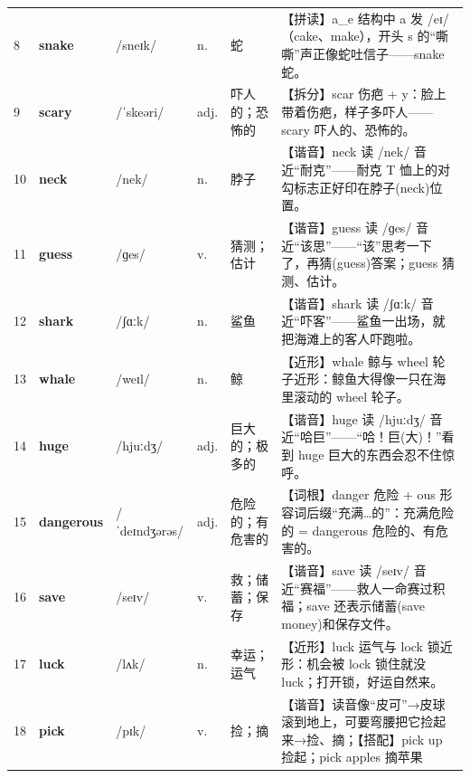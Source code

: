 \documentclass[UTF8,a4paper,11pt,oneside]{ctexbook}
\newcommand{\cellword}[1]{{\bfseries\textcolor{wordcol}{#1}}}
\newcommand{\cellipa}[1]{{\footnotesize\textcolor{ipacol}{#1}}}
\newcommand{\cellpos}[1]{\textcolor{poscol}{#1}}
\newcommand{\cellno}[1]{\textcolor{volcolor!75!black}{#1}}
\begin{document}
{\begin{longtable}{@{}C{0.045\textwidth}L{0.155\textwidth}L{0.175\textwidth}C{0.070\textwidth}L{0.180\textwidth}L{0.282\textwidth}@{}}
\cellno{8} & \cellword{snake} & \cellipa{/sneɪk/} & \cellpos{n.} & 蛇 & \textcolor{tagSpell}{【拼读】}a\_e 结构中 a 发 /eɪ/（cake、make），开头 s 的“嘶嘶”声正像蛇吐信子——snake 蛇。 \\
 \cellno{9} & \cellword{scary} & \cellipa{/ˈskeəri/} & \cellpos{adj.} & 吓人的；恐怖的 & \textcolor{tagSplit}{【拆分】}scar 伤疤 + y：脸上带着伤疤，样子多吓人——scary 吓人的、恐怖的。 \\
\cellno{10} & \cellword{neck} & \cellipa{/nek/} & \cellpos{n.} & 脖子 & \textcolor{tagSound}{【谐音】}neck 读 /nek/ 音近“耐克”——耐克 T 恤上的对勾标志正好印在脖子(neck)位置。 \\
 \cellno{11} & \cellword{guess} & \cellipa{/ɡes/} & \cellpos{v.} & 猜测；估计 & \textcolor{tagSound}{【谐音】}guess 读 /ɡes/ 音近“该思”——“该”思考一下了，再猜(guess)答案；guess 猜测、估计。 \\
\cellno{12} & \cellword{shark} & \cellipa{/ʃɑːk/} & \cellpos{n.} & 鲨鱼 & \textcolor{tagSound}{【谐音】}shark 读 /ʃɑːk/ 音近“吓客”——鲨鱼一出场，就把海滩上的客人吓跑啦。 \\
 \cellno{13} & \cellword{whale} & \cellipa{/weɪl/} & \cellpos{n.} & 鲸 & \textcolor{tagNear}{【近形】}whale 鲸与 wheel 轮子近形：鲸鱼大得像一只在海里滚动的 wheel 轮子。 \\
\cellno{14} & \cellword{huge} & \cellipa{/hjuːdʒ/} & \cellpos{adj.} & 巨大的；极多的 & \textcolor{tagSound}{【谐音】}huge 读 /hjuːdʒ/ 音近“哈巨”——“哈！巨(大)！”看到 huge 巨大的东西会忍不住惊呼。 \\
 \cellno{15} & \cellword{dangerous} & \cellipa{/ˈdeɪndʒərəs/} & \cellpos{adj.} & 危险的；有危害的 & \textcolor{tagRoot}{【词根】}danger 危险 + ous 形容词后缀“充满…的”：充满危险的 = dangerous 危险的、有危害的。 \\
\cellno{16} & \cellword{save} & \cellipa{/seɪv/} & \cellpos{v.} & 救；储蓄；保存 & \textcolor{tagSound}{【谐音】}save 读 /seɪv/ 音近“赛福”——救人一命赛过积福；save 还表示储蓄(save money)和保存文件。 \\
 \cellno{17} & \cellword{luck} & \cellipa{/lʌk/} & \cellpos{n.} & 幸运；运气 & \textcolor{tagNear}{【近形】}luck 运气与 lock 锁近形：机会被 lock 锁住就没 luck；打开锁，好运自然来。 \\
\cellno{18} & \cellword{pick} & \cellipa{/pɪk/} & \cellpos{v.} & 捡；摘 & \textcolor{tagSound}{【谐音】}读音像“皮可”→\allowbreak{}皮球滚到地上，可要弯腰把它捡起来→\allowbreak{}捡、摘；\textcolor{tagColloc}{【搭配】}pick up 捡起；pick apples 摘苹果 \\

\end{longtable}}
\end{document}
